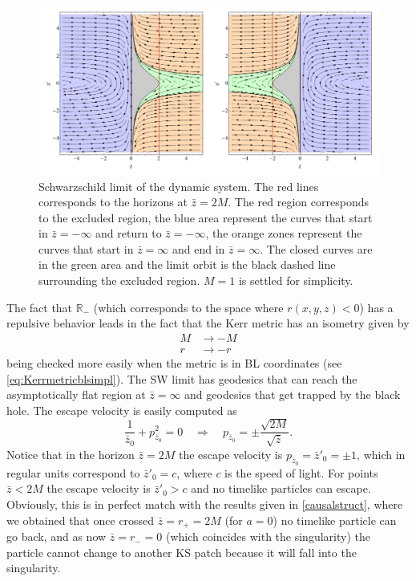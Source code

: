  \begin{figure}[b!] 
\begin{center}
 \centerline{\includegraphics[width=\textwidth]{img/Chapter3/lim.png}}
 \end{center}
 \caption{Schwarzschild limit of the dynamic system. The red lines corresponds to the horizons at $\bar z=2M$. The red region corresponds to the excluded region, the blue area represent the curves that start in $\bar z=-\infty$ and return to $\bar z=-\infty$, the orange zones represent the curves that start in $\bar z=\infty$ and end in $\bar z=\infty$. The closed curves are in the green area and the limit orbit is the black dashed line surrounding the excluded region. $M=1$ is settled for simplicity.}
 \label{fig:alimit}
\end{figure}  
The fact that $\mathbb{R}_-$ (which corresponds to the space where $r(x,y,z)<0$) has a repulsive behavior leads in the fact that the Kerr metric has an isometry given by
\begin{align}
 M &\to - M\\
 r &\to - r
\end{align}
being checked more easily when the metric is in \gls{BL} coordinates (see \cref{eq:Kerrmetricblsimpl}). The \gls{SW} limit has geodesics that can reach the asymptotically flat region at $\bar z=\infty$ and geodesics that get trapped by the black hole. The escape velocity is easily computed as
\begin{equation}
 \frac{1}{\bar{z}_0}+p_{\bar{z}_0}^2=0 \quad \Longrightarrow \quad p_{\bar{z}_0} = \pm \frac{\sqrt{2 M}}{\sqrt{\bar z}}.
\end{equation}
Notice that in the horizon $\bar z=2M$ the escape velocity is $p_{\bar{z}_0}=\bar{z}'_0= \pm 1$, which in regular units correspond to $\bar{z}'_0=c$, where $c$ is the speed of light. For points $\bar z<2M$ the escape velocity is $\bar{z}'_0>c$ and no timelike particles can escape. Obviously, this is in perfect match with the results given in \cref{causalstruct}, where we obtained that once crossed $\bar z=r_+=2M$ (for $a=0$) no timelike particle can go back, and as now $\bar z=r_-=0$ (which coincides with the singularity) the particle cannot change to another \gls{KS} patch because it will fall into the singularity.

